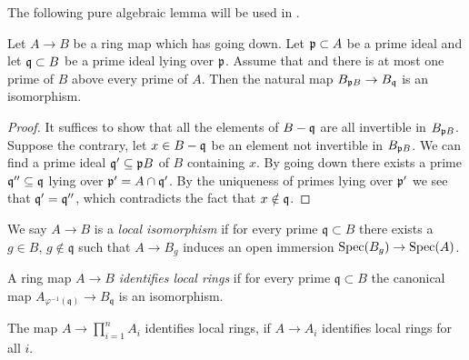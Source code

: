 The following pure algebraic lemma will be used in .

\begin{lemma}
  \label{thm:localization-isom-of-going-down}
  \leanok
  Let $A \to B$ be a ring map which has going down. Let ${\mathfrak{p}} \subset A$ be a prime ideal and let 
  ${\mathfrak{q}} \subset B$ be a prime ideal lying over ${\mathfrak{p}}$. Assume that and there is at most one prime
  of $B$ above every prime of $A$. Then the natural map $B_{{\mathfrak{p}} B} \to B_{{\mathfrak{q}}}$ is an isomorphism.
\end{lemma}

\begin{proof}
  \leanok
  It suffices to show that all the elements of $B - {\mathfrak{q}}$ are all invertible in $B_{{\mathfrak{p}} B}$. Suppose the contrary, let $x \in B - {\mathfrak{q}}$ be an element not invertible in $B_{{\mathfrak{p}} B}$. We can find a prime ideal ${\mathfrak{q}}' \subseteq {\mathfrak{p}} B$ of $B$ containing $x$. By going down there exists a prime ${\mathfrak{q}}'' \subseteq {\mathfrak{q}}$ lying over ${\mathfrak{p}}' = A \cap {\mathfrak{q}}'$. By the uniqueness of primes lying over ${\mathfrak{p}}'$ we see that ${\mathfrak{q}}' = {\mathfrak{q}}''$, which contradicts the fact that $x \notin {\mathfrak{q}}$.
\end{proof}

\begin{definition}
  \label{def:local-isomorphism}
  \leanok
  We say $A \to B$ is a \emph{local isomorphism} if for every prime $\mathfrak{q} \subset B$ there exists a $g \in B$, $g \notin \mathfrak{q}$ such that $A \to B_g$ induces an open immersion $\operatorname{Spec} (B_g) \to \operatorname{Spec} (A)$.
\end{definition}

\begin{definition}
  A ring map $A \to B$ \emph{identifies local rings} if for every prime $\mathfrak{q} \subset B$ the canonical map $A_{\varphi^{-1}(\mathfrak{q})} \to B_{\mathfrak{q}}$ is an isomorphism.
  \label{def:identify-local-rings}
  \leanok
\end{definition}

\begin{lemma}
  \label{thm:finite-product-identifies-local-rings}
  \leanok
  The map \(A \to \prod_{i = 1}^{n} A_i \) identifies local rings, if \(A \to A_i\) identifies
  local rings for all \(i\).
\end{lemma}


